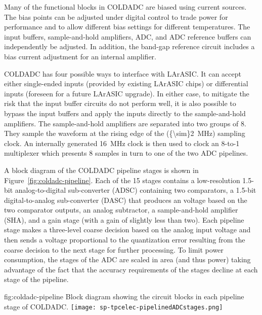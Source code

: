 Many of the functional blocks in COLDADC are biased using current sources.  The bias points can be adjusted under digital control to trade power for performance and to allow different bias settings for different temperatures.  The input buffers, sample-and-hold amplifiers, ADC, and ADC reference buffers can independently be adjusted.  In addition, the band-gap reference circuit includes a bias current adjustment for an internal amplifier.

COLDADC has four possible ways to interface with LArASIC.  It can accept either single-ended inputs (provided by existing LArASIC chips) or differential inputs (foreseen for a future LArASIC upgrade).  In either case, to mitigate the risk that the input buffer circuits do not perform well, it is also possible to bypass the input buffers and apply the inputs directly to the sample-and-hold amplifiers.  The sample-and-hold amplifiers are separated into two groups of 8.  They sample the waveform at the rising edge of the (\SI{{\sim}2}{MHz}) sampling clock.  An internally generated \SI{16}{MHz} clock is then used to clock an 8-to-1 multiplexer which presents 8 samples in turn to one of the two ADC pipelines.

A block diagram of the COLDADC pipeline stages is shown in Figure~\ref{fig:coldadc-pipeline}.  Each of the 15 stages contains a low-resolution 1.5-bit analog-to-digital sub-converter (ADSC) containing two comparators, a 1.5-bit digital-to-analog sub-converter (DASC) that produces an voltage based on the two comparator outputs, an analog subtractor, a sample-and-hold amplifier (SHA), and a gain stage (with a gain of slightly less than two).  Each pipeline stage makes a three-level coarse decision based on the analog input voltage and then sends a voltage proportional to the quantization error resulting from the coarse decision to the next stage for further processing.  To limit power consumption, the stages of the ADC are scaled in area (and thus power) taking advantage of the fact that the accuracy requirements of the stages decline at each stage of the pipeline.

\begin{dunefigure}
{fig:coldadc-pipeline}
{Block diagram showing the circuit blocks in each pipeline stage of COLDADC.}
\texttt{[image: sp-tpcelec-pipelinedADCstages.png]}
\end{dunefigure}


